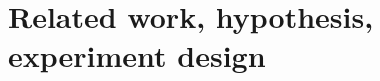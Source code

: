 \documentclass{beamer}
\begin{document}
\section{Related work, hypothesis, experiment design}



\end{document}
